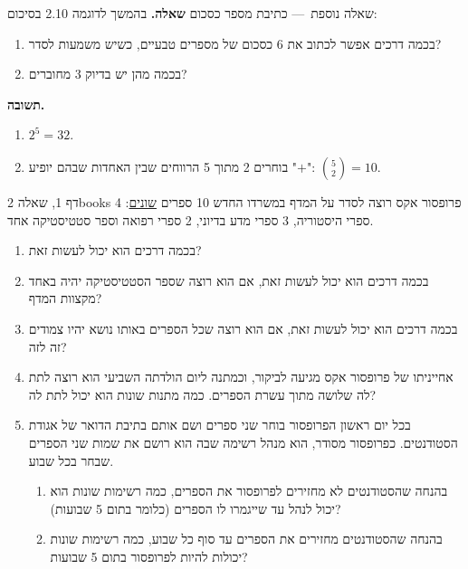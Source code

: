 \documentclass[11pt,a4paper]{report}
\newcommand{\dash}{{\rmfamily —}}
\begin{document}
\begin{suggestion}{שאלה נוספת~\dash{} כתיבת מספר כסכום}
\textbf{שאלה.} בהמשך לדוגמה 2.10 בסיכום:
\begin{enumerate}[label=(\alph*),itemsep=1pt,topsep=2pt]
  \item בכמה דרכים אפשר לכתוב את 6 כסכום של מספרים טבעיים, כשיש משמעות לסדר?
  \item בכמה מהן יש בדיוק 3 מחוברים?
\end{enumerate}

\textbf{תשובה.}
\begin{enumerate}[label=(\alph*),itemsep=1pt,topsep=2pt]
  \item $2^5=32$.
  \item בוחרים 2 מתוך 5 הרווחים שבין האחדות שבהם יופיע "$+$": $\binom52=10$.
\end{enumerate}
\end{suggestion}


\begin{exercise}{דף 1, שאלה 2}{books}
פרופסור אקס רוצה לסדר על המדף במשרדו החדש 10 ספרים \underline{שונים}: 4 ספרי היסטוריה, 3 ספרי מדע בדיוני, 2 ספרי רפואה וספר סטטיסטיקה אחד.
\begin{enumerate}[label=(\alph*)]
  \item בכמה דרכים הוא יכול לעשות זאת?
  \item בכמה דרכים הוא יכול לעשות זאת, אם הוא רוצה שספר הסטטיסטיקה יהיה באחד מקצוות המדף?
  \item בכמה דרכים הוא יכול לעשות זאת, אם הוא רוצה שכל הספרים באותו נושא יהיו צמודים זה לזה?
  \item אחייניתו של פרופסור אקס מגיעה לביקור, וכמתנה ליום הולדתה השביעי הוא רוצה לתת לה שלושה מתוך עשרת הספרים. כמה מתנות שונות הוא יכול לתת לה?
  \item בכל יום ראשון הפרופסור בוחר שני ספרים ושם אותם בתיבת הדואר של אגודת הסטודנטים. כפרופסור מסודר, הוא מנהל רשימה שבה הוא רושם את שמות שני הספרים שבחר בכל שבוע.
  \begin{enumerate}[label=(\arabic*)]
    \item בהנחה שהסטודנטים לא מחזירים לפרופסור את הספרים, כמה רשימות שונות הוא יכול לנהל עד שייגמרו לו הספרים (כלומר בתום 5 שבועות)?
    \item בהנחה שהסטודנטים מחזירים את הספרים עד סוף כל שבוע, כמה רשימות שונות יכולות להיות לפרופסור בתום 5 שבועות?
  \end{enumerate}
\end{enumerate}
\end{exercise}
\end{document}
